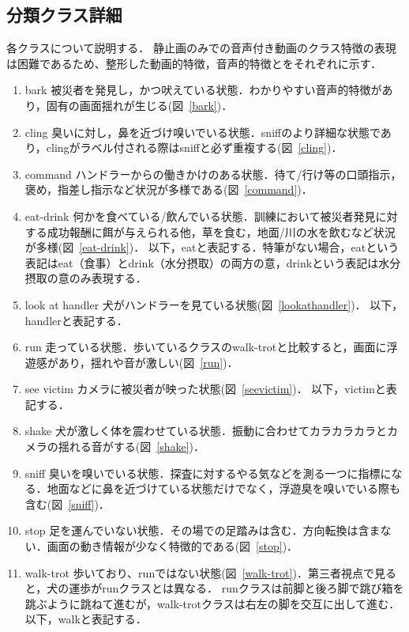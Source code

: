 \subsection{分類クラス詳細}
各クラスについて説明する．
静止画のみでの音声付き動画のクラス特徴の表現は困難であるため、整形した動画的特徴，音声的特徴とをそれぞれに示す．
\begin{enumerate}
\item{bark}
被災者を発見し，かつ吠えている状態．わかりやすい音声的特徴があり，固有の画面揺れが生じる(図~\ref{bark})．
\item{cling}
臭いに対し，鼻を近づけ嗅いでいる状態．sniffのより詳細な状態であり，clingがラベル付される際はsniffと必ず重複する(図~\ref{cling})．
\item{command}
ハンドラーからの働きかけのある状態．待て/行け等の口頭指示，褒め，指差し指示など状況が多様である(図~\ref{command})．
\item{eat-drink}
何かを食べている/飲んでいる状態．訓練において被災者発見に対する成功報酬に餌が与えられる他，草を食む，地面/川の水を飲むなど状況が多様(図~\ref{eat-drink})．
以下，eatと表記する．特筆がない場合，eatという表記はeat（食事）とdrink（水分摂取）の両方の意，drinkという表記は水分摂取の意のみ表現する．
\item{look at handler}
犬がハンドラーを見ている状態(図~\ref{lookathandler})．
以下，handlerと表記する．
\item{run}
走っている状態．歩いているクラスのwalk-trotと比較すると，画面に浮遊感があり，揺れや音が激しい(図~\ref{run})．
\item{see victim}
カメラに被災者が映った状態(図~\ref{seevictim})．
以下，victimと表記する．
\item{shake}
犬が激しく体を震わせている状態．振動に合わせてカラカラカラとカメラの揺れる音がする(図~\ref{shake})．
\item{sniff}
臭いを嗅いでいる状態．探査に対するやる気などを測る一つに指標になる．地面などに鼻を近づけている状態だけでなく，浮遊臭を嗅いでいる際も含む(図~\ref{sniff})．
\item{stop}
足を運んでいない状態．その場での足踏みは含む．方向転換は含まない．画面の動き情報が少なく特徴的である(図~\ref{stop})．
\item{walk-trot}
歩いており、runではない状態(図~\ref{walk-trot})．第三者視点で見ると，犬の運歩がrunクラスとは異なる．
runクラスは前脚と後ろ脚で跳び箱を跳ぶように跳ねて進むが，walk-trotクラスは右左の脚を交互に出して進む．
以下，walkと表記する．
\begin{end}
\begin{figure}[H]

\end{figure}
\end{end}
\end{enumerate}
